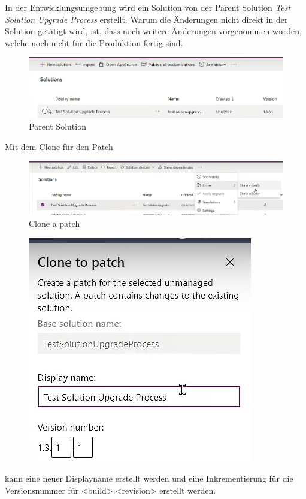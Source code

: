 In der Entwicklungsumgebung wird ein Solution von der Parent Solution \textit{Test Solution Upgrade Process} erstellt. Warum die Änderungen nicht direkt in der Solution getätigt wird, ist, dass noch weitere Änderungen vorgenommen wurden, welche noch nicht für die Produktion fertig sind.
\begin{figure}[H]
	\centering
	\includegraphics[scale = 0.3]{attachment/chapter_13/Scc036}
	\caption{Parent Solution}
\end{figure}
Mit dem Clone für den Patch
\begin{figure}[H]
	\centering
	\includegraphics[scale = 0.3]{attachment/chapter_13/Scc037}
	\caption{Clone a patch}
\end{figure}
\begin{figure}[H]
	\centering
	\includegraphics[scale = 0.3]{attachment/chapter_13/Scc038}
\end{figure}
kann eine neuer Displayname erstellt werden und eine Inkrementierung für die Versionsnummer für <build>.<revision> erstellt werden.\\
